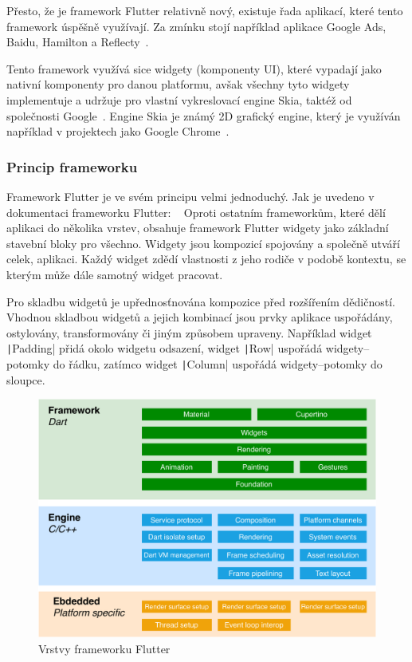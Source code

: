 Přesto,
že je framework Flutter relativně nový,
existuje řada aplikací,
které tento framework úspěšně využívají.
Za zmínku stojí například aplikace Google Ads, Baidu, Hamilton a
Reflecty~\cite{flutter}.

Tento framework využívá sice widgety (komponenty UI),
které vypadají jako nativní komponenty pro danou platformu,
avšak všechny tyto widgety implementuje a udržuje pro vlastní vykreslovací
engine Skia,
taktéž od společnosti Google~\cite{flutter}.
Engine Skia je známý 2D grafický engine,
který je využíván například v projektech jako Google Chrome~\cite{skia}.

\subsubsection*{Princip frameworku}

Framework Flutter je ve svém principu velmi jednoduchý.
Jak je uvedeno v dokumentaci frameworku Flutter:
\emph{}~\cite{flutter_technical_overview}
Oproti ostatním frameworkům,
které dělí aplikaci do několika vrstev,
obsahuje framework Flutter widgety jako základní stavební bloky pro všechno.
Widgety jsou kompozicí spojovány a společně utváří celek, aplikaci.
Každý widget zdědí vlastnosti z jeho rodiče v podobě kontextu,
se kterým může dále samotný widget pracovat.~\cite{flutter_technical_overview}

Pro skladbu widgetů je upřednosťnována kompozice před rozšířením dědičností.
Vhodnou skladbou widgetů a jejich kombinací jsou prvky aplikace uspořádány,
ostylovány, transformovány či jiným způsobem upraveny.
Například widget \texttt|Padding| přidá okolo widgetu odsazení,
widget \texttt|Row| uspořádá widgety--potomky do řádku,
zatímco widget \texttt|Column| uspořádá widgety--potomky
do sloupce.~\cite{flutter_technical_overview}

\begin{figure}[ht!]
    \centering
    \includegraphics[width=\linewidth]{assets/technology-research/framework/flutter_overview.pdf}
    \caption{Vrstvy frameworku Flutter~\cite{flutter_technical_overview}}
    \label{fig:flutter_layers}
\end{figure}

